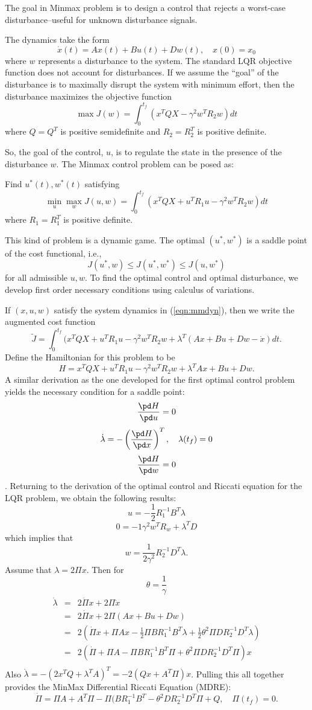 The goal in Minmax problem is to design a control that rejects a worst-case disturbance--useful for unknown disturbance signals.

The dynamics take the form
\begin{equation}\label{eqn:mmdyn}
\dot x(t) = Ax(t) + Bu(t) + Dw(t), \quad x(0) = x_0
\end{equation}
where $w$ represents a disturbance to the system. The standard LQR objective function does not account for disturbances. If we assume the ``goal'' of the disturbance is to maximally disrupt the system with minimum effort, then the disturbance maximizes the objective function
$$\max J(w) = \int_0^{t_f} (x^TQX - \gamma^2w^TR_2w)dt$$
where $Q=Q^T$ is positive semidefinite and $R_2 = R_2^T$ is positive definite. 

So, the goal of the control, $u$, is to regulate the state in the presence of the disturbance $w$. The Minmax control problem can be posed as:

Find $u^*(t), w^*(t)$ satisfying
$$\min_u \max_w J(u,w) = \int_0^{t_f} (x^TQX + u^TR_1u- \gamma^2w^TR_2w)dt$$
where $R_1=R_1^T$ is positive definite.

This kind of problem is a dynamic game. The optimal $(u^*,w^*)$ is a saddle point of the cost functional, i.e.,
$$J(u^*,w)\leq J(u^*,w^*)\leq J(u,w^*)$$
for all admissible $u, w$.
To find the optimal control and optimal disturbance, we develop first order necessary conditions using calculus of variations.

If $(x,u,w)$ satisfy the system dynamics in (\ref{eqn:mmdyn}), then we write the augmented cost function
$$ \tilde J = \int_0^{t_f} (x^TQX + u^TR_1u- \gamma^2w^TR_2w + \lambda^T(Ax + Bu + Dw - \dot x)dt.$$
Define the Hamiltonian for this problem to be
$$H = x^TQX + u^TR_1u- \gamma^2w^TR_2w + \lambda^TAx + Bu + Dw.$$
A similar derivation as the one developed for the first optimal control problem yields the necessary condition for a saddle point:
$$\frac{\pd H}{\pd u} = 0$$
$$\dot \lambda = -\left(\frac{\pd H}{\pd x}\right)^T, \quad \lambda(t_f) = 0$$
$$\frac{\pd H}{\pd w} = 0$$.
Returning to the derivation of the optimal control and Riccati equation for the LQR problem, we obtain the following results:
$$ u = -\frac 1 2 R_1^{-1}B^T\lambda$$
$$0 = -1\gamma^2w^TR_w + \lambda^T D$$ which implies that $$w = \frac{1}{2\gamma^2} R_2^{-1}D^T\lambda.$$
Assume that $\lambda = 2\Pi x$. Then for $$\theta = \frac 1 \gamma$$
\begin{eqnarray*}
\dot \lambda &=& 2\dot\Pi x + 2\Pi \dot x\\
&=& 2\dot\Pi x + 2\Pi (Ax+Bu+Dw)\\
&=& 2\left(\dot\Pi x  + \Pi Ax   -\frac 1 2 \Pi B R_1^{-1}B^T\lambda+\frac 1 2\theta^2\Pi D R_2^{-1}D^T\lambda\right) \\
&=& 2\left(\dot\Pi  + \Pi A   - \Pi B R_1^{-1}B^T\Pi +\theta^2 \Pi DR_2^{-1}D^T\Pi \right)x \\
\end{eqnarray*}
Also $\dot\lambda = -(2x^TQ + \lambda^TA)^T = -2(Qx + A^T\Pi)x$.  Pulling this all together provides the MinMax Differential Riccati Equation (MDRE):
$$\dot\Pi = \Pi A + A^T\Pi - \Pi(BR_1^{-1}B^T - \theta^2DR_2^{-1}D^T\Pi + Q, \quad \Pi(t_f) = 0.$$


